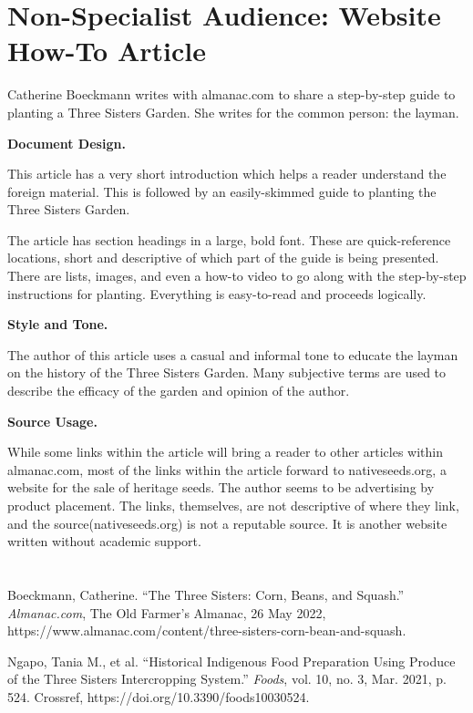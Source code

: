 \documentclass[12pt,a4paper,english]{article}
\begin{document}
\begin{flushleft}
\section*{Non-Specialist Audience: Website How-To Article}
Catherine Boeckmann writes with almanac.com to share a step-by-step guide to planting a Three Sisters Garden. She writes for the common person: the layman.
\par

\textbf{Document Design.} %
\par
This article has a very short introduction which helps a reader understand the foreign material. This is followed by an easily-skimmed guide to planting the Three Sisters Garden. 
\par
The article has section headings in a large, bold font. These are quick-reference locations, short and descriptive of which part of the guide is being presented. There are lists, images, and even a how-to video to go along with the step-by-step instructions for planting. Everything is easy-to-read and proceeds logically.

\textbf{Style and Tone.} %
\par
The author of this article uses a casual and informal tone to educate the layman on the history of the Three Sisters Garden. Many subjective terms are used to describe the efficacy of the garden and opinion of the author.
\par

\textbf{Source Usage.} %
\par
While some links within the article will bring a reader to other articles within almanac.com, most of the links within the article forward to nativeseeds.org, a website for the sale of heritage seeds. The author seems to be advertising by product placement. The links, themselves, are not descriptive of where they link, and the source(nativeseeds.org) is not a reputable source. It is another website written without academic support.
\pagebreak

\section*{}
\begin{hangparas}{2em}{1}
  Boeckmann, Catherine. “The Three Sisters: Corn, Beans, and Squash.” \emph{Almanac.com}, The Old Farmer's Almanac, 26 May 2022, https://www.almanac.com/content/three-sisters-corn-bean-and-squash. 
  \par
  Ngapo, Tania M., et al. “Historical Indigenous Food Preparation Using Produce of the Three Sisters Intercropping System.” \emph{Foods}, vol. 10, no. 3, Mar. 2021, p. 524. Crossref, https://doi.org/10.3390/foods10030524.
\end{hangparas}
\end{flushleft}
\end{document}
